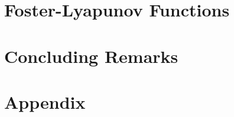 \documentclass[ twoside,openright,titlepage,numbers=noenddot,%
                headinclude,footinclude,cleardoublepage=empty,abstract=on,
                BCOR=5mm,paper=b5,fontsize=11pt,
		dvipsnames
                ]{scrbook}
\begin{document}
\part{Foster-Lyapunov Functions}
\cleardoublepage
\part{Concluding Remarks}
\cleardoublepage
\appendix
\part{Appendix}

\backmatter
\cleardoublepage
\cleardoublepage
\cleardoublepage
\end{document}
